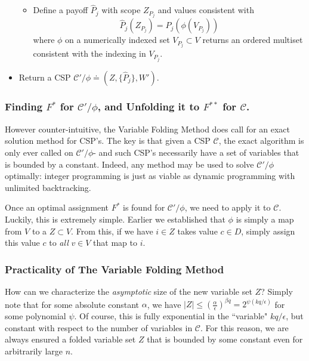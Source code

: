 \begin{algorithm}
\begin{itemize}
\begin{itemize}
	\item Define a payoff $\hat{P}_j$ with scope $Z_{P_j}$ and values consistent with
		\begin{equation}
		\hat{P}_j(Z_{P_j}) = P_j\left(\phi\left(V_{P_j}\right)\right)
		\end{equation}
		where $\phi$ on a numerically indexed set $V_{P_j} \subset V$ returns an ordered multiset consistent with the indexing in $V_{P_j}$.
	\end{itemize}
\item Return a CSP $\mathcal{C}'/\phi  \doteq (Z, \{\hat{P}_j\}, W')$.
\end{itemize}
\end{algorithm}

\subsubsection{Finding $F^*$ for $\mathcal{C}'/\phi$, and Unfolding it to $F^{**}$ for $\mathcal{C}$.}

However counter-intuitive, the Variable Folding Method does call for an exact solution method for CSP's. The key is that given a CSP $\mathcal{C}$, the exact algorithm is only ever called on $\mathcal{C}'/\phi$- and such CSP's necessarily have a set of variables that is bounded by a constant. Indeed, any method may be used to solve $\mathcal{C}'/\phi$ optimally: integer programming is just as viable as dynamic programming with unlimited backtracking.

Once an optimal assignment $F^*$ is found for $\mathcal{C}'/\phi$, we need to apply it to $\mathcal{C}$. Luckily, this is extremely simple. Earlier we established that $\phi$ is simply a map from $V$ to a $Z \subset V$. From this, if we have $i \in Z$ takes value $c \in D$, simply assign this value $c$ to \textit{all} $v \in V$ that map to $i$.

\subsubsection{Practicality of The Variable Folding Method}

How can we characterize the \textit{asymptotic} size of the new variable set $Z$? Simply note that for some absolute constant $\alpha$, we have $|Z| \leq \left(\frac{\alpha}{\epsilon}\right)^{\beta q} = 2^{\psi(kq/\epsilon)}$ for some polynomial $\psi$. Of course, this is fully exponential in the ``variable" $kq/\epsilon$, but constant with respect to the number of variables in $\mathcal{C}$. For this reason, we are always ensured a folded variable set $Z$ that is bounded by some constant even for arbitrarily large $n$.

